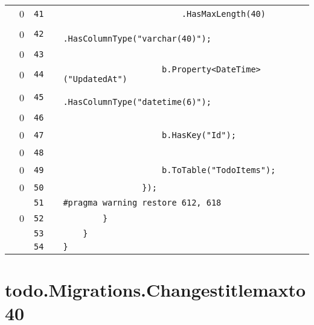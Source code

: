 \documentclass[a4paper,landscape,10pt]{article}
\begin{document}
\begin{longtable}[l]{lrrll}
\cellcolor{red} & 0 & \verb~41~ & & \verb~                        .HasMaxLength(40)~\\
\cellcolor{red} & 0 & \verb~42~ & & \verb~                        .HasColumnType("varchar(40)");~\\
\cellcolor{red} & 0 & \verb~43~ & & \verb~~\\
\cellcolor{red} & 0 & \verb~44~ & & \verb~                    b.Property<DateTime>("UpdatedAt")~\\
\cellcolor{red} & 0 & \verb~45~ & & \verb~                        .HasColumnType("datetime(6)");~\\
\cellcolor{red} & 0 & \verb~46~ & & \verb~~\\
\cellcolor{red} & 0 & \verb~47~ & & \verb~                    b.HasKey("Id");~\\
\cellcolor{red} & 0 & \verb~48~ & & \verb~~\\
\cellcolor{red} & 0 & \verb~49~ & & \verb~                    b.ToTable("TodoItems");~\\
\cellcolor{red} & 0 & \verb~50~ & & \verb~                });~\\
\cellcolor{gray} &  & \verb~51~ & & \verb~#pragma warning restore 612, 618~\\
\cellcolor{red} & 0 & \verb~52~ & & \verb~        }~\\
\cellcolor{gray} &  & \verb~53~ & & \verb~    }~\\
\cellcolor{gray} &  & \verb~54~ & & \verb~}~\\
\end{longtable}
\newpage
\section{todo.Migrations.Changestitlemaxto40}
\end{document}
